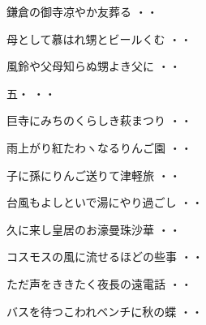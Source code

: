 \begin{shiika}鎌倉の御寺凉やか友葬る
\hfill{・・}\end{shiika}
\vspace{0.6cm}
\begin{shiika}母として慕はれ甥とビールくむ
\hfill{・・}\end{shiika}
\vspace{0.6cm}
\begin{shiika}風鈴や父母知らぬ甥よき父に
\hfill{・・}\end{shiika}
\vspace{0.6cm}
\begin{shiika}五・
\hfill{・・}\end{shiika}
\vspace{0.6cm}
\begin{shiika}巨寺にみちのくらしき萩まつり
\hfill{・・}\end{shiika}
\vspace{0.6cm}
\begin{shiika}雨上がり紅たわヽなるりんご園
\hfill{・・}\end{shiika}
\vspace{0.6cm}
\begin{shiika}子に孫にりんご送りて津軽旅
\hfill{・・}\end{shiika}
\vspace{0.6cm}
\begin{shiika}台風もよしといで湯にやり過ごし
\hfill{・・}\end{shiika}
\vspace{0.6cm}
\begin{shiika}久に来し皇居のお濠曼珠沙華
\hfill{・・}\end{shiika}
\vspace{0.6cm}
\begin{shiika}コスモスの風に流せるほどの些事
\hfill{・・}\end{shiika}
\vspace{0.6cm}
\begin{shiika}ただ声をききたく夜長の遠電話
\hfill{・・}\end{shiika}
\vspace{0.6cm}
\begin{shiika}バスを待つこわれベンチに秋の蝶
\hfill{・・}\end{shiika}
